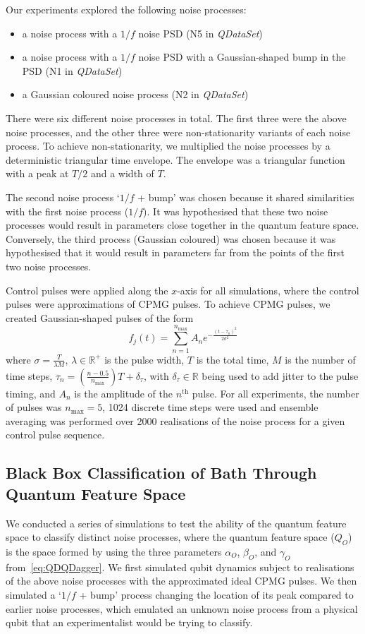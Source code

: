 \documentclass[12pt]{iopart}
\begin{document}
Our experiments explored the following noise processes:
\begin{itemize}
    \item a noise process with a $1/f$ noise PSD (N5 in \textit{QDataSet})
    \item a noise process with a $1/f$ noise PSD with a Gaussian-shaped bump in the PSD (N1 in \textit{QDataSet})
    \item a Gaussian coloured noise process (N2 in \textit{QDataSet})
\end{itemize}
There were six different noise processes in total. The first three were the above noise processes, and the other three were non-stationarity variants of each noise process. To achieve non-stationarity, we multiplied the noise processes by a deterministic triangular time envelope. The envelope was a triangular function with a peak at $T/2$ and a width of $T$.

The second noise process `$1/f$ + bump' was chosen because it shared similarities with the first noise process ($1/f$). It was hypothesised that these two noise processes would result in parameters close together in the quantum feature space. Conversely, the third process (Gaussian coloured) was chosen because it was hypothesised that it would result in parameters far from the points of the first two noise processes.

Control pulses were applied along the $x$-axis for all simulations, where the control pulses were approximations of CPMG pulses. To achieve CPMG pulses, we created Gaussian-shaped pulses of the form
\begin{equation} \label{eq:gaussian_pulse}
    f_{j}(t)=\sum_{n=1}^{n_{\max }} A_n e^{-\frac{\left(t-\tau_{n}\right)^{2}}{2 \sigma^{2}}}
\end{equation}
where $\sigma=\frac{T}{\lambda M}$, $\lambda \in \mathbb{R}^+$ is the pulse width, $T$ is the total time, $M$ is the number of time steps, $\tau_{n}=\left(\frac{n-0.5}{n_{\max }}\right) T+\delta_{\tau}$, with $\delta_{\tau} \in \mathbb{R}$ being used to add jitter to the pulse timing, and $A_n$ is the amplitude of the $n^{\mathrm{th}}$ pulse. For all experiments, the number of pulses was $n_{\max}=5$, 1024 discrete time steps were used and ensemble averaging was performed over 2000 realisations of the noise process for a given control pulse sequence.

\subsection{Black Box Classification of Bath Through Quantum Feature Space \label{subsec:black_box_noise_spectroscopy}}
We conducted a series of simulations to test the ability of the quantum feature space to classify distinct noise processes, where the quantum feature space ($Q_O$) is the space formed by using the three parameters $\alpha_O$, $\beta_O$, and $\gamma_O$ from~\cref{eq:QDQDagger}. We first simulated qubit dynamics subject to realisations of the above noise processes with the approximated ideal CPMG pulses. We then simulated a `$1/f$ + bump' process changing the location of its peak compared to earlier noise processes, which emulated an unknown noise process from a physical qubit that an experimentalist would be trying to classify.
\end{document}
